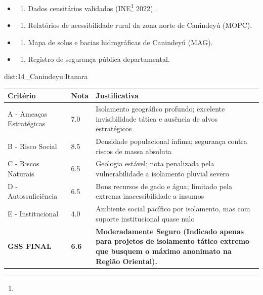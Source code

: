 {\begin{itemize}
\tightlist
\item
  \begin{enumerate}
  \def\labelenumi{\arabic{enumi})}
  \tightlist
  \item
    Dados censitários validados (INE\footnote{\fineINE} 2022).
  \end{enumerate}
\item
  \begin{enumerate}
  \def\labelenumi{\arabic{enumi})}
  \setcounter{enumi}{1}
  \tightlist
  \item
    Relatórios de acessibilidade rural da zona norte de Canindeyú
    (MOPC).
  \end{enumerate}
\item
  \begin{enumerate}
  \def\labelenumi{\arabic{enumi})}
  \setcounter{enumi}{2}
  \tightlist
  \item
    Mapa de solos e bacias hidrográficas de Canindeyú (MAG).
  \end{enumerate}
\item
  \begin{enumerate}
  \def\labelenumi{\arabic{enumi})}
  \setcounter{enumi}{3}
  \tightlist
  \item
    Registro de segurança pública departamental.
  \end{enumerate}
\end{itemize}}{dist:14_Canindeyu:Itanara}
\begin{table}[ht!]
\small \begin{tabular}{p{3.0cm}p{0.8cm}p{6.0cm}} \toprule
\textbf{Critério} & \textbf{Nota} & \textbf{Justificativa} \\ \midrule
A - Ameaças Estratégicas & 7.0 & Isolamento geográfico profundo; excelente invisibilidade tática e ausência de alvos estratégicos \\
B - Risco Social & 8.5 & Densidade populacional ínfima; segurança contra riscos de massa absoluta \\
C - Riscos Naturais & 6.5 & Geologia estável; nota penalizada pela vulnerabilidade a isolamento pluvial severo \\
D - Autossuficiência & 6.5 & Bons recursos de gado e água; limitado pela extrema inacessibilidade a insumos \\
E - Institucional & 4.0 & Ambiente social pacífico por isolamento, mas com suporte institucional quase nulo \\
\midrule \textbf{GSS FINAL} & \textbf{6.6} & \textbf{Moderadamente Seguro (Indicado apenas para projetos de isolamento tático extremo que busquem o máximo anonimato na Região Oriental).} \\ \bottomrule \end{tabular}
\end{table}
